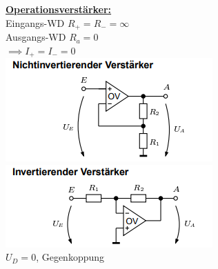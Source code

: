\documentclass[8pt]{extarticle}
\begin{document}
\begin{minipage}{0.33\textwidth}
\underline{\textbf{Operationsverstärker:}}\\
Eingangs-WD $R_+ = R_- = \infty$ \\
Ausgangs-WD $R_a = 0$ \\
$\implies I_+ = I_- = 0$ \\

\includegraphics[scale=0.40]{NIOV.png}
\includegraphics[scale=0.40]{IOV.png} \\
$U_D = 0$, Gegenkoppung\\


\end{minipage}
\end{document}
